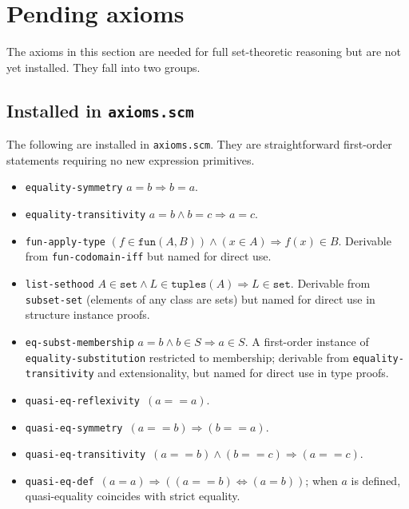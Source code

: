

\section{Pending axioms}
\label{sec:pending-axioms}

The axioms in this section are needed for full set-theoretic reasoning
but are not yet installed.  They fall into two groups.

\subsection*{Installed in \texttt{axioms.scm}}

The following are installed in \texttt{axioms.scm}.
They are straightforward first-order statements requiring no new
expression primitives.

\begin{itemize}

\item \texttt{equality-symmetry}
  $a = b \Rightarrow b = a$.

\item \texttt{equality-transitivity}
  $a = b \land b = c \Rightarrow a = c$.

\item \texttt{fun-apply-type}
  $(f \in \mathtt{fun}(A,B)) \land (x \in A) \Rightarrow f(x) \in B$.
  Derivable from \texttt{fun-codomain-iff} but named for direct use.

\item \texttt{list-sethood}
  $A \in \mathtt{set} \land L \in \mathtt{tuples}(A) \Rightarrow L \in \mathtt{set}$.
  Derivable from \texttt{subset-set} (elements of any class are sets)
  but named for direct use in structure instance proofs.

\item \texttt{eq-subst-membership}
  $a = b \land b \in S \Rightarrow a \in S$.
  A first-order instance of \texttt{equality-substitution} restricted to
  membership; derivable from \texttt{equality-transitivity} and
  extensionality, but named for direct use in type proofs.

\item \texttt{quasi-eq-reflexivity}\ $(a \mathbin{==} a)$.

\item \texttt{quasi-eq-symmetry}\ $(a \mathbin{==} b) \Rightarrow (b \mathbin{==} a)$.

\item \texttt{quasi-eq-transitivity}\
  $(a \mathbin{==} b) \land (b \mathbin{==} c) \Rightarrow (a \mathbin{==} c)$.

\item \texttt{quasi-eq-def}\
  $(a = a) \Rightarrow ((a \mathbin{==} b) \Leftrightarrow (a = b))$;
  when $a$ is defined, quasi-equality coincides with strict equality.

\end{itemize}

